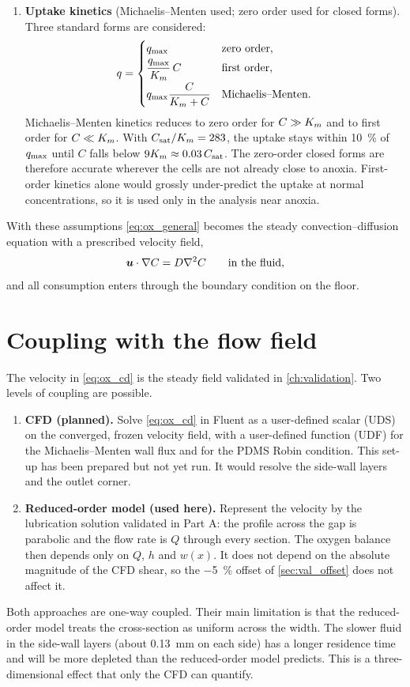 \begin{enumerate}
\item \textbf{Uptake kinetics} (Michaelis--Menten used; zero order used for closed forms). Three standard forms are considered:
\begin{equation}
q=\begin{cases}
q_{\max} & \text{zero order},\\[2pt]
\dfrac{q_{\max}}{K_{m}}\,C & \text{first order},\\[6pt]
q_{\max}\dfrac{C}{K_{m}+C} & \text{Michaelis--Menten}.
\end{cases}
\label{eq:ox_kinetics}
\end{equation}
Michaelis--Menten kinetics reduces to zero order for $C\gg K_{m}$ and to first order for $C\ll K_{m}$. With $C_{\mathrm{sat}}/K_{m}=283$, the uptake stays within \SI{10}{\percent} of $q_{\max}$ until $C$ falls below $9K_{m}\approx0.03\,C_{\mathrm{sat}}$. The zero-order closed forms are therefore accurate wherever the cells are not already close to anoxia. First-order kinetics alone would grossly under-predict the uptake at normal concentrations, so it is used only in the analysis near anoxia.
\end{enumerate}

With these assumptions \cref{eq:ox_general} becomes the steady convection--diffusion equation with a prescribed velocity field,
\begin{equation}
\bm{u}\cdot\nabla C=D\nabla^2C\qquad\text{in the fluid},
\label{eq:ox_cd}
\end{equation}
and all consumption enters through the boundary condition on the floor.

\section{Coupling with the flow field}

The velocity in \cref{eq:ox_cd} is the steady field validated in \cref{ch:validation}. Two levels of coupling are possible.
\begin{enumerate}
\item \textbf{CFD (planned).} Solve \cref{eq:ox_cd} in Fluent as a user-defined scalar (UDS) on the converged, frozen velocity field, with a user-defined function (UDF) for the Michaelis--Menten wall flux and for the PDMS Robin condition. This set-up has been prepared but not yet run. It would resolve the side-wall layers and the outlet corner.
\item \textbf{Reduced-order model (used here).} Represent the velocity by the lubrication solution validated in Part A: the profile across the gap is parabolic and the flow rate is $Q$ through every section. The oxygen balance then depends only on $Q$, $h$ and $w(x)$. It does not depend on the absolute magnitude of the CFD shear, so the \SI{-5}{\percent} offset of \cref{sec:val_offset} does not affect it.
\end{enumerate}
Both approaches are one-way coupled. Their main limitation is that the reduced-order model treats the cross-section as uniform across the width. The slower fluid in the side-wall layers (about \SI{0.13}{mm} on each side) has a longer residence time and will be more depleted than the reduced-order model predicts. This is a three-dimensional effect that only the CFD can quantify.


